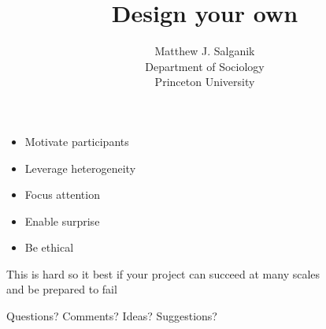 \documentclass[aspectratio=169]{beamer}
\title[]{Design your own}
\author[]{Matthew J. Salganik\\Department of Sociology\\Princeton University}
\date[]{Summer Institute in Computational Social Science\\June 23, 2017
\vfill
\begin{flushright}
\vspace{0.6in}
\texttt{[image: figures/cc-by.png]}
\end{flushright}
}
\begin{document}
\frame{\titlepage}
\begin{frame}

\begin{itemize}
\item Motivate participants
\pause
\item Leverage heterogeneity
\pause
\item Focus attention
\pause
\item Enable surprise
\pause
\item Be ethical
\end{itemize}

\end{frame}
\begin{frame}

This is hard so it best if your project can succeed at many scales\\
and be prepared to fail

\end{frame}
\begin{frame}

{\Large
\begin{center}
Questions?  Comments?  Ideas?  Suggestions?
\end{center}
}

\end{frame}
\end{document}
